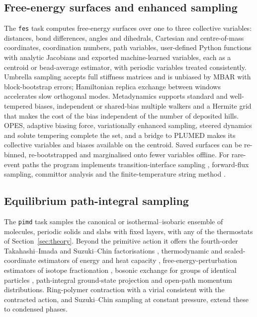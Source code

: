 \documentclass[preprint,12pt]{elsarticle}
\newcommand{\code}[1]{\texttt{#1}}
\begin{document}
\subsection{Free-energy surfaces and enhanced sampling}

The \code{fes} task computes free-energy surfaces over one to three collective variables: distances, bond differences, angles and dihedrals, Cartesian and centre-of-mass coordinates, coordination numbers, path variables, user-defined Python functions with analytic Jacobians and exported machine-learned variables, each as a centroid or bead-average estimator, with periodic variables treated consistently. Umbrella sampling accepts full stiffness matrices and is unbiased by MBAR with block-bootstrap errors; Hamiltonian replica exchange between windows \cite{samp-reus2000} accelerates slow orthogonal modes. Metadynamics supports standard and well-tempered biases, independent or shared-bias multiple walkers \cite{samp-walkers2006} and a Hermite grid that makes the cost of the bias independent of the number of deposited hills. OPES, adaptive biasing force, variationally enhanced sampling, steered dynamics and solute tempering complete the set, and a bridge to PLUMED \cite{samp-plumed2014} makes its collective variables and biases available on the centroid. Saved surfaces can be re-binned, re-bootstrapped and marginalised onto fewer variables offline. For rare-event paths the program implements transition-interface sampling \cite{samp-tis2003}, forward-flux sampling, committor analysis and the finite-temperature string method \cite{samp-string2002}.

\subsection{Equilibrium path-integral sampling}

The \code{pimd} task samples the canonical or isothermal--isobaric ensemble of molecules, periodic solids and slabs with fixed layers, with any of the thermostats of Section~\ref{sec:theory}. Beyond the primitive action it offers the fourth-order Takahashi--Imada and Suzuki--Chin factorisations \cite{ti84,sc16}, thermodynamic and scaled-coordinate estimators of energy and heat capacity \cite{yam05}, free-energy-perturbation estimators of isotope fractionation \cite{iso13}, bosonic exchange for groups of identical particles \cite{bose19}, path-integral ground-state projection \cite{pigs00} and open-path momentum distributions. Ring-polymer contraction with a virial consistent with the contracted action, and Suzuki--Chin sampling at constant pressure, extend these to condensed phases.
\end{document}
